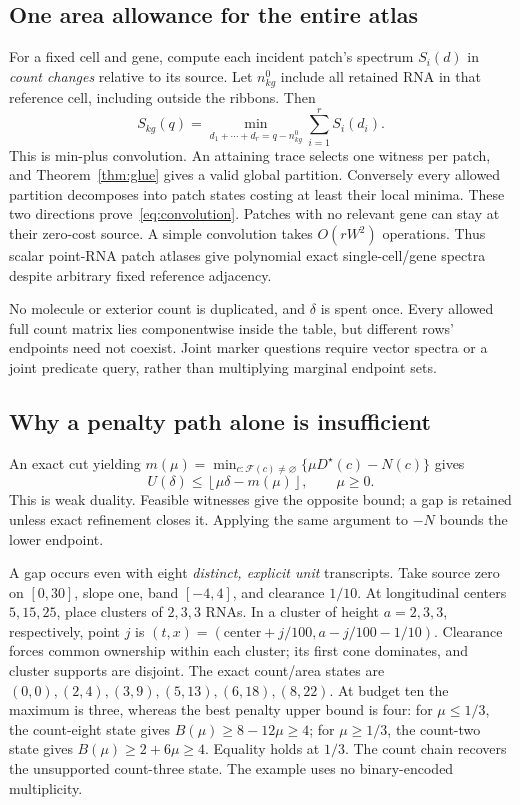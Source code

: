\documentclass[10pt,letterpaper]{article}
\newcommand{\F}{\mathcal F}
\begin{document}
\subsection{One area allowance for the entire atlas}
For a fixed cell and gene, compute each incident patch's spectrum $S_i(d)$ in \emph{count changes} relative to its source. Let $n^0_{kg}$ include all retained RNA in that reference cell, including outside the ribbons. Then
\begin{equation}
S_{kg}(q)=\min_{d_1+\cdots+d_r=q-n^0_{kg}}\sum_{i=1}^r S_i(d_i).\label{eq:convolution}
\end{equation}
This is min-plus convolution. An attaining trace selects one witness per patch, and Theorem~\ref{thm:glue} gives a valid global partition. Conversely every allowed partition decomposes into patch states costing at least their local minima. These two directions prove~\eqref{eq:convolution}. Patches with no relevant gene can stay at their zero-cost source. A simple convolution takes $O(rW^2)$ operations. Thus scalar point-RNA patch atlases give polynomial exact single-cell/gene spectra despite arbitrary fixed reference adjacency.

No molecule or exterior count is duplicated, and $\delta$ is spent once. Every allowed full count matrix lies componentwise inside the table, but different rows' endpoints need not coexist. Joint marker questions require vector spectra or a joint predicate query, rather than multiplying marginal endpoint sets.

\subsection{Why a penalty path alone is insufficient}
An exact cut yielding $m(\mu)=\min_{c:\F(c)\ne\varnothing}\{\mu D^\star(c)-N(c)\}$ gives
\begin{equation}
U(\delta)\le\left\lfloor\mu\delta-m(\mu)\right\rfloor,\qquad\mu\ge0.\label{eq:dual}
\end{equation}
This is weak duality. Feasible witnesses give the opposite bound; a gap is retained unless exact refinement closes it. Applying the same argument to $-N$ bounds the lower endpoint.

A gap occurs even with eight \emph{distinct, explicit unit} transcripts. Take source zero on $[0,30]$, slope one, band $[-4,4]$, and clearance $1/10$. At longitudinal centers $5,15,25$, place clusters of $2,3,3$ RNAs. In a cluster of height $a=2,3,3$, respectively, point $j$ is $(t,x)=(\mathrm{center}+j/100,a-j/100-1/10)$. Clearance forces common ownership within each cluster; its first cone dominates, and cluster supports are disjoint. The exact count/area states are $(0,0),(2,4),(3,9),(5,13),(6,18),(8,22)$. At budget ten the maximum is three, whereas the best penalty upper bound is four: for $\mu\le1/3$, the count-eight state gives $B(\mu)\ge8-12\mu\ge4$; for $\mu\ge1/3$, the count-two state gives $B(\mu)\ge2+6\mu\ge4$. Equality holds at $1/3$. The count chain recovers the unsupported count-three state. The example uses no binary-encoded multiplicity.
\end{document}
